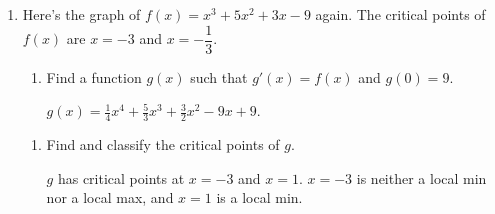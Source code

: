 \documentclass{article}
\begin{document}
\begin{enumerate}[resume, topsep=0pt]
  \begin{solution}
    The ends are going in opposite directions, so the degree
    must be odd. There are 4 turning points, so the degree
    must be at least 5.
  \end{solution}

\item 

  Here's the graph of $f(x) = x^3 + 5x^2 + 3x - 9$ again. The critical points of $f(x)$ are $x = - 3$ and $x = - \dfrac{1}{3}$. 

  \begin{minipage}[t]{1.5in}
    \vspace{-4pt}
  \end{minipage}
  \begin{minipage}[t]{\linewidth-1.7in}
    \vspace{-8pt}
    \begin{enumerate}
    \item
      \begin{problem}
        Find a function $g(x)$ such that $g'(x) = f(x)$ and $g(0) = 9$.
      \end{problem}

      \begin{solution}
        $g(x)=\frac{1}{4}x^4 + \frac{5}{3}x^3 + \frac{3}{2}x^2 -9x + 9$.
      \end{solution}

    \end{enumerate}
  \end{minipage}

  \begin{enumerate}[start=2]

  \item
    \begin{problem}[\vfill]
      Find and classify the critical points of $g$. 
    \end{problem}

    \begin{solution}
      $g$ has critical points at $x=-3$ and $x=1$. $x=-3$ is neither
      a local min nor a local max, and $x=1$ is a local min.
    \end{solution}


\end{enumerate}
\end{enumerate}
\end{document}
